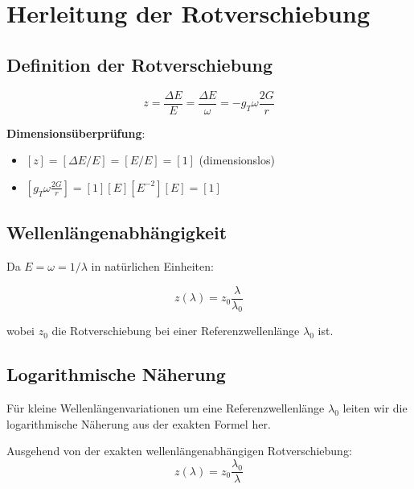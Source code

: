 \documentclass[12pt,a4paper]{article}
\begin{document}
	\section{Herleitung der Rotverschiebung}
	\label{sec:redshift_derivation}
	
	\subsection{Definition der Rotverschiebung}
	\label{subsec:redshift_definition}
	
	\begin{equation}
		\label{eq:redshift_definition}
		z = \frac{\Delta E}{E} = \frac{\Delta E}{\omega} = -g_T \omega \frac{2G}{r}
	\end{equation}
	
	\textbf{Dimensionsüberprüfung}:
	\begin{itemize}
		\item $[z] = [\Delta E/E] = [E/E] = [1]$ (dimensionslos) \checkmark
		\item $[g_T \omega \frac{2G}{r}] = [1][E][E^{-2}][E] = [1]$ \checkmark
	\end{itemize}
	
	\subsection{Wellenlängenabhängigkeit}
	\label{subsec:wavelength_dependence}
	
	Da $E = \omega = 1/\lambda$ in natürlichen Einheiten:
	
	\begin{equation}
		\label{eq:wavelength_dependence}
		z(\lambda) = z_0 \frac{\lambda}{\lambda_0}
	\end{equation}
	
	wobei $z_0$ die Rotverschiebung bei einer Referenzwellenlänge $\lambda_0$ ist.
	
\subsection{Logarithmische Näherung}
\label{subsec:logarithmic_approximation}

Für kleine Wellenlängenvariationen um eine Referenzwellenlänge $\lambda_0$ leiten wir die logarithmische Näherung aus der exakten Formel her.

Ausgehend von der exakten wellenlängenabhängigen Rotverschiebung:
\begin{equation}
	z(\lambda) = z_0 \frac{\lambda_0}{\lambda}
\end{equation}
\end{document}
